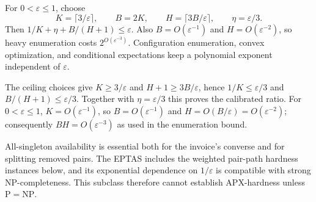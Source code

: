 \begin{parameterchoice}
For $0<\varepsilon\le1$, choose
\[
 K=\lceil3/\varepsilon\rceil,\qquad B=2K,\qquad
 H=\lceil3B/\varepsilon\rceil,\qquad \eta=\varepsilon/3.
\]
Then $1/K+\eta+B/(H+1)\le\varepsilon$.
Also $B=O(\varepsilon^{-1})$ and $H=O(\varepsilon^{-2})$, so heavy
enumeration costs $2^{O(\varepsilon^{-3})}$. Configuration enumeration,
convex optimization, and conditional expectations keep a polynomial
exponent independent of $\varepsilon$.
\end{parameterchoice}

The ceiling choices give $K\ge3/\varepsilon$ and
$H+1\ge3B/\varepsilon$, hence
$1/K\le\varepsilon/3$ and $B/(H+1)\le\varepsilon/3$.
Together with $\eta=\varepsilon/3$ this proves the calibrated ratio.
For $0<\varepsilon\le1$, $K=O(\varepsilon^{-1})$, so
$B=O(\varepsilon^{-1})$ and
$H=O(B/\varepsilon)=O(\varepsilon^{-2})$; consequently
$BH=O(\varepsilon^{-3})$ as used in the enumeration bound.

All-singleton availability is essential both for the invoice's converse
and for splitting removed pairs. The EPTAS includes the weighted
pair-path hardness instances below, and its exponential dependence on
$1/\varepsilon$ is compatible with strong NP-completeness. This
subclass therefore cannot establish APX-hardness unless
$\mathrm P=\mathrm{NP}$.
